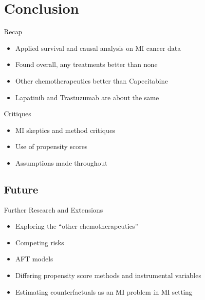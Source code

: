 \section{Conclusion}

\begin{frame}{Recap}
 \begin{itemize}
  \item Applied survival and causal analysis on MI cancer data
  \item Found overall, any treatments better than none
  \item Other chemotherapeutics better than Capecitabine
  \item Lapatinib and Trastuzumab are about the same
 \end{itemize}

\end{frame}


\begin{frame}{Critiques}
 \begin{itemize}
  \item MI skeptics and method critiques
  \item Use of propensity scores
  \item Assumptions made throughout
  \end{itemize}

\end{frame}

\subsection{Future}
\begin{frame}{Further Research and Extensions}

\begin{itemize}
 \item Exploring the ``other chemotherapeutics''
 \item Competing risks
 \item AFT models
 \item Differing propensity score methods and instrumental variables
 \item Estimating counterfactuals as an MI problem in MI setting
 
\end{itemize}

 
\end{frame}

